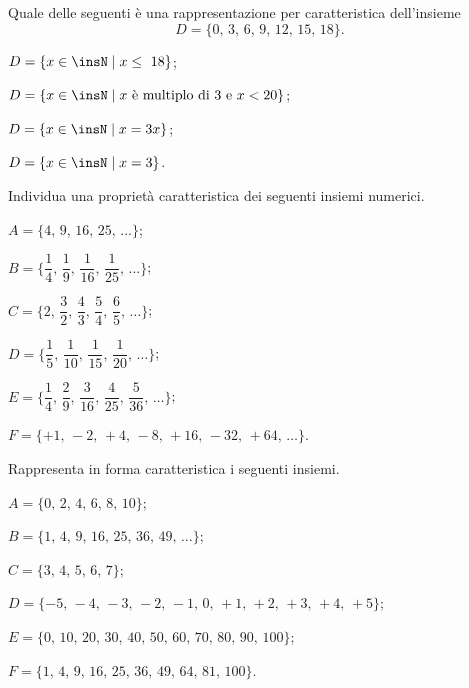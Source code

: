 \begin{esercizio}
\label{ese:\thechapter.27}
Quale delle seguenti è una rappresentazione per caratteristica
dell'insieme
\[D = \{\text{0, 3, 6, 9, 12, 15, 18}\}.\]
\begin{enumeratea}
\item $D=\{x\in\insN\mid x\le~18\}$;
\item $D=\{x\in\insN\mid x\text{ è multiplo di~3 e }x<20\}$;%
\item $D=\{x\in\insN\mid x=3x\}$;
\item $D=\{x\in\insN\mid x=3\}$.
\end{enumeratea}
\end{esercizio}
\pagebreak
\begin{esercizio}
Individua una proprietà caratteristica dei seguenti insiemi numerici.
\label{ese:\thechapter.28}
\begin{enumeratea}
\spazielenx
 \item $A=\{\text{4, 9, 16, 25, \ldots}\}$;
 \item $B=\bigg\{\dfrac{1}{4}\text{, }\dfrac{1}{9}\text{, }\dfrac{1}{16}\text{, }\dfrac{1}{25}\text{, }\ldots\bigg\}$;
 \item $C=\bigg\{2\text{, }\dfrac{3}{2}\text{, }\dfrac{4}{3}\text{, }\dfrac{5}{4}\text{, }\dfrac{6}{5}\text{, }\ldots\bigg\}$;
 \item $D=\bigg\{\dfrac{1}{5}\text{, }\dfrac{1}{10}\text{, }\dfrac{1}{15}\text{, }\dfrac{1}{20}\text{, }\ldots\bigg\}$;
 \item $E=\bigg\{\dfrac{1}{4}\text{, }\dfrac{2}{9}\text{, }\dfrac{3}{16}\text{, }\dfrac{4}{25}\text{, }\dfrac{5}{36}\text{, }\ldots\bigg\}$;
 \item $F=\{+1\text{, }-2\text{, }+4\text{, }-8\text{, }+16\text{, }-32\text{, }+64\text{, }\ldots\}$.
 \end{enumeratea}
\end{esercizio}

\begin{esercizio}
\label{ese:\thechapter.29}
Rappresenta in forma caratteristica i seguenti insiemi.
\begin{enumeratea}
\item $A=\{\text{0, 2, 4, 6, 8, 10}\}$;
\item $B=\{\text{1, 4, 9, 16, 25, 36, 49, \ldots}\}$;
\item $C=\{\text{3, 4, 5, 6, 7}\}$;
\item $D=\{-5\text{, }-4\text{, }-3\text{, }-2\text{, }-1\text{, }0\text{, }+1\text{, }+2\text{, }+3\text{, }+4\text{, }+5\}$;
\item $E=\{\text{0, 10, 20, 30, 40, 50, 60, 70, 80, 90, 100}\}$;
\item $F=\{\text{1, 4, 9, 16, 25, 36, 49, 64, 81, 100}\}$.
\end{enumeratea}
\end{esercizio}

